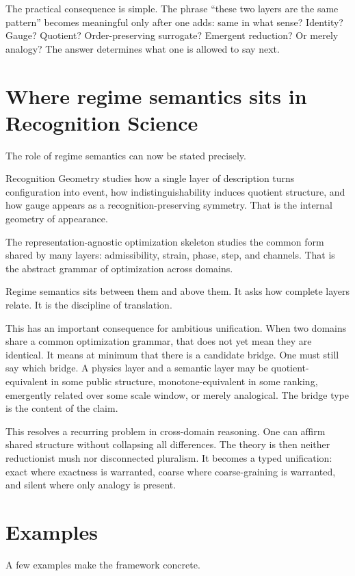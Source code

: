 \documentclass[11pt]{article}
\begin{document}
The practical consequence is simple. The phrase ``these two layers are the same pattern'' becomes meaningful only after one adds: same in what sense? Identity? Gauge? Quotient? Order-preserving surrogate? Emergent reduction? Or merely analogy? The answer determines what one is allowed to say next.

\section{Where regime semantics sits in Recognition Science}

The role of regime semantics can now be stated precisely.

Recognition Geometry studies how a single layer of description turns configuration into event, how indistinguishability induces quotient structure, and how gauge appears as a recognition-preserving symmetry. That is the internal geometry of appearance.

The representation-agnostic optimization skeleton studies the common form shared by many layers: admissibility, strain, phase, step, and channels. That is the abstract grammar of optimization across domains.

Regime semantics sits between them and above them. It asks how complete layers relate. It is the discipline of translation.

This has an important consequence for ambitious unification. When two domains share a common optimization grammar, that does not yet mean they are identical. It means at minimum that there is a candidate bridge. One must still say which bridge. A physics layer and a semantic layer may be quotient-equivalent in some public structure, monotone-equivalent in some ranking, emergently related over some scale window, or merely analogical. The bridge type is the content of the claim.

This resolves a recurring problem in cross-domain reasoning. One can affirm shared structure without collapsing all differences. The theory is then neither reductionist mush nor disconnected pluralism. It becomes a typed unification: exact where exactness is warranted, coarse where coarse-graining is warranted, and silent where only analogy is present.

\section{Examples}

A few examples make the framework concrete.
\end{document}
